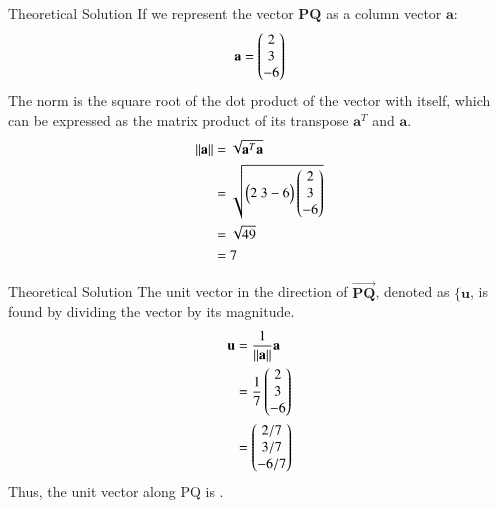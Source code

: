 \documentclass{beamer}
\begin{document}
\begin{frame}{Theoretical Solution}
If we represent the vector \(\mathbf{PQ}\) as a column vector \(\mathbf{a}\):
\[
\mathbf{a} = 
\myvec{2\\3\\-6}
\]
The norm is the square root of the dot product of the vector with itself, which can be expressed as the matrix product of its transpose \(\mathbf{a}^T\) and \(\mathbf{a}\).
\begin{align}
    \left\| \mathbf{a} \right\| &= \sqrt{\mathbf{a}^T \mathbf{a}} \\
    &= \sqrt{
        \myvec{2\ 3-6}
        \myvec{2\\3\\-6}
    } \\
    &= \sqrt{49} \\
    &= 7
\end{align}
\end{frame}
\begin{frame}{Theoretical Solution}
The unit vector in the direction of $\vec{\mathbf{PQ}}$, denoted as $\mathbf{\{u}$, is found by dividing the vector by its magnitude.
\begin{align}
     \mathbf{u} &= \frac{1}{\left\| \mathbf{a} \right\|} \mathbf{a} \\
    &= \frac{1}{7} 
    \myvec{2\\3\\-6} \\
    &= 
    \myvec{2/7\\3/7\\-6/7}
\end{align}
Thus, the unit vector along PQ is  .
\end{frame}
\end{document}

